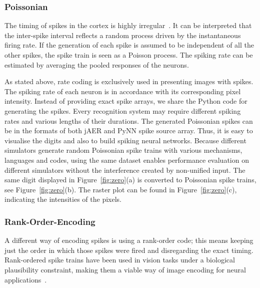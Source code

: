 \documentclass{frontiersENG} %
\begin{document}
\subsubsection{Poissonian}
\label{sec:poissonian}
The timing of spikes in the cortex is highly irregular~\citep{squire1998findings}.
It can be interpreted that the inter-spike interval reflects a random process driven by the instantaneous firing rate.
If the generation of each spike is assumed to be independent of all the other spikes, the spike train is seen as a Poisson process.
The spiking rate can be estimated by averaging the pooled responses of the neurons.

As stated above, rate coding is exclusively used in presenting images with spikes.
The spiking rate of each neuron is in accordance with its corresponding pixel intensity.
Instead of providing exact spike arrays, we share the Python code for generating the spikes.
Every recognition system may require different spiking rates and various lengths of their durations.
The generated Poissonian spikes can be in the formats of both jAER and PyNN spike source array.
Thus, it is easy to visualise the digits and also to build spiking neural networks.
Because different simulators generate random Poissonian spike trains with various mechanisms, languages and codes, using the same dataset enables performance evaluation on different simulators without the interference created by non-unified input.
The same digit displayed in Figure~\ref{fig:zero}(a) is converted to Poissonian spike trains, see Figure~\ref{fig:zero}(b).
The raster plot can be found in Figure~\ref{fig:zero}(c), indicating the intensities of the pixels.



\subsubsection{Rank-Order-Encoding}
A different way of encoding spikes is using a rank-order code; this means
keeping just the order in which those spikes were fired and disregarding the exact timing. Rank-ordered spike trains have been used in vision tasks under a biological plausibility constraint, making them a viable way of image encoding for neural applications~\citep{van2001rate,sen2009evaluating,masmoudi2010novel}.
\end{document}
